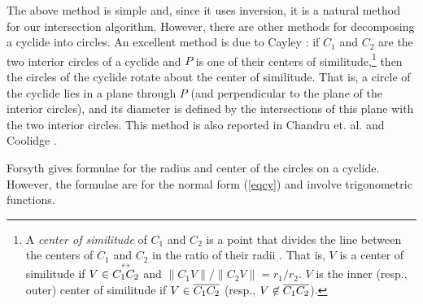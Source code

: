 The above method is simple and, since it uses inversion, 
it is a natural method for our intersection algorithm.
However, there are other methods for decomposing a cyclide into circles.
%
An excellent method is due to Cayley \cite{CAY96}:
if $C_1$ and $C_2$ are the two interior circles of a cyclide
and $P$ is one of their centers of similitude,\footnote{A 
	{\em center of similitude} of $C_1$ and $C_2$ 
	is a point that divides the line
	between the centers of $C_1$ and $C_2$ in the ratio of their radii 
	\cite{Pedoe70}.
	That is, $V$ is a center of similitude if $V \in \mbox{$\stackrel{\leftrightarrow}{C_1 C_2}$}$
	and $\|C_1 V\| / \|C_2 V\| = r_1 / r_2 $.
	$V$ is the inner (resp., outer) center of similitude if
	$V \in \mbox{$\overline{C_1 C_2}$}$ (resp., $V \not \in \mbox{$\overline{C_1 C_2}$}$).}
then the circles of the cyclide rotate about the center of similitude.
That is, a circle of the cyclide lies in a plane through $P$ (and
perpendicular to the plane of the interior circles),
and its diameter is defined by the intersections of this plane
with the two interior circles.
This method is also reported in Chandru et. al. \cite[p. 282]{CDH89a}
and Coolidge \cite[p. 270]{Coo71}.

Forsyth \cite{F12} gives formulae for the radius and center of the circles on a
cyclide. 
However, the formulae are for the normal form (\ref{eqcy}) 
and involve trigonometric functions.





